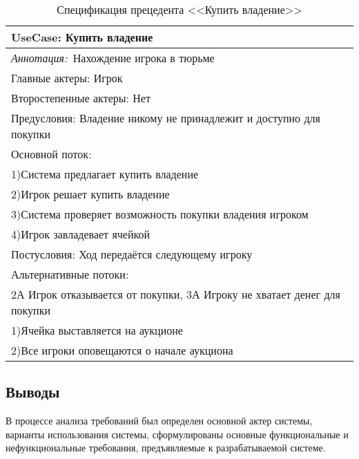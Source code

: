 \newpage
\begin{table}[h!]
    \caption{Спецификация прецедента <<Купить владение>>}
    \begin{tabular}{|l|}
        \hline
        \textbf{UseCase: Купить владение}\\
        \hline
        \textit{Аннотация:}\ Нахождение игрока в тюрьме\\
        \hline
        Главные актеры: Игрок \\
        \hline
        Второстепенные актеры: Нет \\
        \hline
        Предусловия: Владение никому не принадлежит и доступно для покупки \\
        \hline
        Основной поток: \\
            1)Система предлагает купить владение \\
            2)Игрок решает купить владение \\
            3)Система проверяет возможность покупки владения игроком \\
            4)Игрок завладевает ячейкой\\
        \hline
        Постусловия: Ход передаётся следующему игроку\\
        \hline
        Альтернативные потоки:\\
        2А Игрок отказывается от покупки, 3А Игроку не хватает денег для покупки\\
        1)Ячейка выставляется на аукционе\\
        2)Все игроки оповещаются о начале аукциона\\
        \hline
    \end{tabular}  
\end{table}
\subsection*{Выводы}
В процессе анализа требований был определен основной актер системы, варианты использования системы, сформулированы основные функциональные и нефункциональные требования, предъявляемые к разрабатываемой системе.